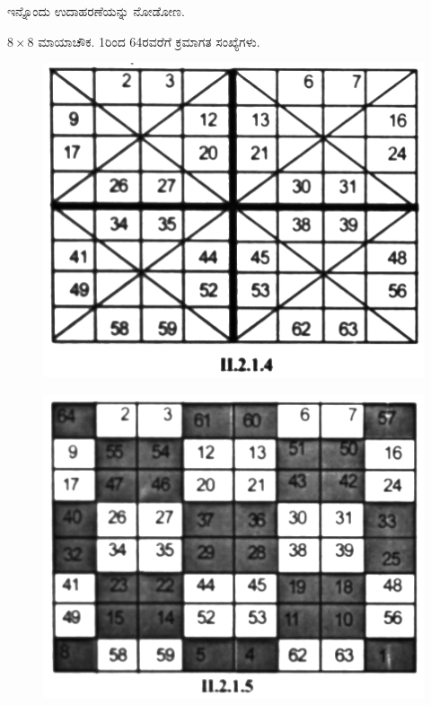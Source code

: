 ಇನ್ನೊಂದು ಉದಾಹರಣೆಯನ್ನು ನೋಡೋಣ.

$8 \times 8$ ಮಾಯಾಚೌಕ. 1ರಿಂದ 64ರವರೆಗೆ ಕ್ರಮಾಗತ ಸಂಖ್ಯೆಗಳು.
\begin{figure}[!h]
\includegraphics{src/figures/chap3/fig3.17.jpg}
\end{figure}
\begin{figure}[h]
\includegraphics{src/figures/chap3/fig3.18.jpg}
\end{figure}

